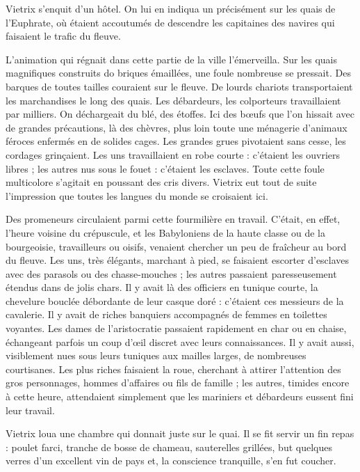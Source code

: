 \documentclass[a4paper, 11pt, oneside, polutonikogreek, french]{article}
\begin{document}
\bigskip
\centerline{\EightStarTaper}
\centerline{\EightStarTaper\EightStarTaper}
\bigskip

Vietrix s'enquit d'un hôtel. On lui en indiqua un précisément sur les quais de l'Euphrate, où étaient accoutumés de descendre les capitaines des navires qui faisaient le trafic du fleuve.

L'animation qui régnait dans cette partie de la ville l'émerveilla. Sur les quais magnifiques construits do briques émaillées, une foule nombreuse se pressait. Des barques de toutes tailles couraient sur le fleuve. De lourds chariots transportaient les marchandises le long des quais. Les débardeurs, les colporteurs travaillaient par milliers. On déchargeait du blé, des étoffes. Ici des bœufs que l'on hissait avec de grandes précautions, là des chèvres, plus loin toute une ménagerie d'animaux féroces enfermés en de solides cages. Les grandes grues pivotaient sans cesse, les cordages grinçaient. Les uns travaillaient en robe courte : c'étaient les ouvriers libres ; les autres nus sous le fouet : c'étaient les esclaves. Toute cette foule multicolore s'agitait en poussant des cris divers. Vietrix eut tout de suite l'impression que toutes les langues du monde se croisaient ici.

Des promeneurs circulaient parmi cette fourmilière en travail. C'était, en effet, l'heure voisine du crépuscule, et les Babyloniens de la haute classe ou de la bourgeoisie, travailleurs ou oisifs, venaient chercher un peu de fraîcheur au bord du fleuve. Les uns, très élégants, marchant à pied, se faisaient escorter d'esclaves avec des parasols ou des chasse-mouches ; les autres passaient paresseusement étendus dans de jolis chars. Il y avait là des officiers en tunique courte, la chevelure bouclée débordante de leur casque doré : c'étaient ces messieurs de la cavalerie. Il y avait de riches banquiers accompagnés de femmes en toilettes voyantes. Les dames de l'aristocratie passaient rapidement en char ou en chaise, échangeant parfois un coup d'œil discret avec leurs connaissances. Il y avait aussi, visiblement nues sous leurs tuniques aux mailles larges, de nombreuses courtisanes. Les plus riches faisaient la roue, cherchant à attirer l'attention des gros personnages, hommes d'affaires ou fils de famille ; les autres, timides encore à cette heure, attendaient simplement que les mariniers et débardeurs eussent fini leur travail.

Vietrix loua une chambre qui donnait juste sur le quai. Il se fit servir un fin repas : poulet farci, tranche de bosse de chameau, sauterelles grillées, but quelques verres d'un excellent vin de pays et, la conscience tranquille, s'en fut coucher.
\end{document}
